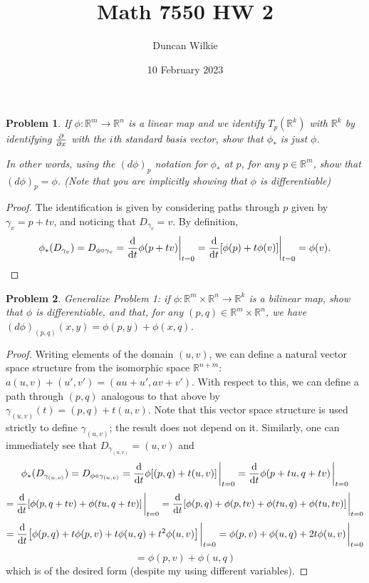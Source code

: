 \documentclass{article}
\title{Math 7550 HW 2}
\author{Duncan Wilkie}
\date{10 February 2023}
\newtheorem{plm}{Problem}
\begin{document}
\maketitle

\begin{plm}
  If $\phi: \mathbb{R}^{m} \to \mathbb{R}^{n}$ is a linear map and we identify $T_{p}(\mathbb{R}^{k})$ with $\mathbb{R}^{k}$
  by identifying $\pdv{x}$ with the $i$th standard basis vector, show that $\phi_{*}$ is just $\phi$.

  In other words, using the $(d\phi)_{p}$ notation for $\phi_{*}$ at $p$, for any $p \in \mathbb{R}^{m}$, show that $(d\phi)_{p} = \phi$.
  (Note that you are implicitly showing that $\phi$ is differentiable)
\end{plm}

\begin{proof}
  The identification is given by considering paths through $p$ given by $\gamma_{v} = p + tv$, and noticing that $D_{\gamma_{v}} = v$.
  By definition,
  \[
    \phi_{*}(D_{\gamma_{v}}) = D_{\phi \circ \gamma_{v}} = \dv{t}\phi(p + tv)\bigg|_{t = 0} = \dv{t}\qty[\phi(p) + t\phi(v)]\bigg|_{t = 0}
    = \phi(v).
  \]
\end{proof}

\begin{plm}
  Generalize Problem 1: if $\phi: \mathbb{R}^{m} \times \mathbb{R}^{n} \to \mathbb{R}^{k}$ is a bilinear map, show that $\phi$ is differentiable,
  and that, for any $(p, q) \in \mathbb{R}^{m} \times \mathbb{R}^{n}$, we have $(d\phi)_{(p,q)}(x,  y) = \phi(p, y) + \phi(x, q)$.
\end{plm}

\begin{proof}
  Writing elements of the domain $(u, v)$, we can define a natural vector space structure from the isomorphic space $\mathbb{R}^{n+m}$:
  $a(u, v) + (u', v') = (au + u', av + v')$.
  With respect to this, we can define a path through $(p, q)$ analogous to that above by $\gamma_{(u, v)}(t) = (p, q) + t(u, v)$.
  Note that this vector space structure is used strictly to define $\gamma_{(u, v)}$; the result does not depend on it.
  Similarly, one can immediately see that $D_{\gamma_{(u, v)}} = (u, v)$ and
  \[
    \phi_{*}(D_{\gamma_{(u, v)}}) = D_{\phi \circ \gamma_{(u, v)}} = \dv{t}\phi[(p, q) + t(u, v)]\eval_{t = 0} = \dv{t}\phi(p + tu, q + tv)\eval_{t = 0}
  \]
  \[
    = \dv{t}\qty[\phi(p, q + tv) + \phi(tu, q + tv)]\eval_{t = 0}
    = \dv{t}\qty[\phi(p, q) + \phi(p, tv) + \phi(tu, q) + \phi(tu, tv)]\eval_{t = 0}
  \]
  \[
    = \dv{t}\qty[\phi(p, q) + t\phi(p, v) + t\phi(u, q) + t^{2}\phi(u, v)]\eval_{t = 0}
    = \phi(p, v) + \phi(u, q) + 2t\phi(u, v)\eval_{t = 0}
  \]
  \[
    = \phi(p, v) + \phi(u, q)
  \]
  which is of the desired form (despite my using different variables).
\end{proof}
\end{document}
